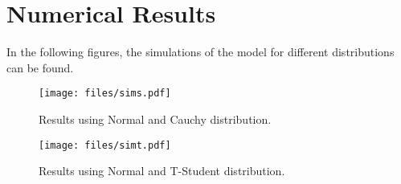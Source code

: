 \section{Numerical Results}\label{sec:numRes}
In the following figures, the simulations of the model for different distributions can be found.
\begin{figure}[h]
  \centering
  \texttt{[image: files/sims.pdf]}
  \caption{Results using Normal and Cauchy distribution.}
\end{figure}

\begin{figure}[h]
  \centering
  \texttt{[image: files/simt.pdf]}
  \caption{Results using Normal and T-Student distribution.}
\end{figure}


